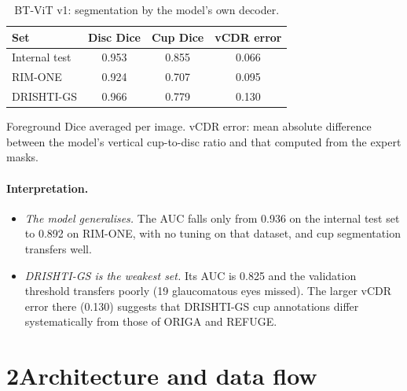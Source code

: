 \documentclass[10pt]{article}
\begin{document}
\begin{table}[h]
\centering
\begin{threeparttable}
\caption{BT-ViT v1: segmentation by the model's own decoder.}
\label{tab:r-seg}
\small
\begin{tabular}{@{}lccc@{}}
\toprule
Set & Disc Dice & Cup Dice & vCDR error \\
\midrule
Internal test & 0.953 & 0.855 & 0.066 \\
RIM-ONE       & 0.924 & 0.707 & 0.095 \\
DRISHTI-GS    & 0.966 & 0.779 & 0.130 \\
\bottomrule
\end{tabular}
\begin{tablenotes}\footnotesize
\item[] Foreground Dice averaged per image. vCDR error: mean absolute difference between the model's
vertical cup-to-disc ratio and that computed from the expert masks.
\end{tablenotes}
\end{threeparttable}
\end{table}

\paragraph{Interpretation.}
\begin{itemize}
\item \emph{The model generalises.} The AUC falls only from 0.936 on the internal test set to 0.892 on
RIM-ONE, with no tuning on that dataset, and cup segmentation transfers well.
\item \emph{DRISHTI-GS is the weakest set.} Its AUC is 0.825 and the validation threshold transfers poorly
(19 glaucomatous eyes missed). The larger vCDR error there (0.130) suggests that DRISHTI-GS cup annotations
differ systematically from those of ORIGA and REFUGE.
\end{itemize}

\clearpage
\section*{2\quad Architecture and data flow}
\end{document}
